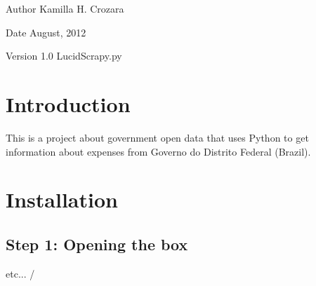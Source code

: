 \begin{DoxyAuthor}{Author}
Kamilla H. Crozara 
\end{DoxyAuthor}
\begin{DoxyDate}{Date}
August, 2012 
\end{DoxyDate}
\begin{DoxyVersion}{Version}
1.0  LucidScrapy.py 
\end{DoxyVersion}
\hypertarget{index_intro_sec}{}\section{Introduction}\label{index_intro_sec}
This is a project about government open data that uses Python to get information about expenses from Governo do Distrito Federal (Brazil).\hypertarget{index_install_sec}{}\section{Installation}\label{index_install_sec}
\hypertarget{index_step1}{}\subsection{Step 1: Opening the box}\label{index_step1}
etc... / 